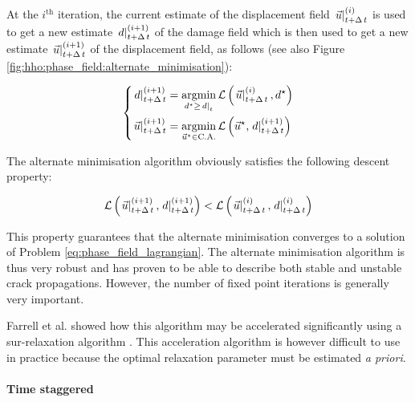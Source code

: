 At the \(i^{\text{th}}\) iteration, the current estimate of the
displacement field \(\left.\vec{u}\right|_{t+\Delta\,t}^{(i)}\) is used to get a new estimate
\(\left.d\right|_{t+\Delta\,t}^{(i+1)}\) of the damage field which is then used to get a new
estimate \(\left.\vec{u}\right|_{t+\Delta\,t}^{(i+1)}\) of the displacement field, as follows
(see also Figure \ref{fig:hho:phase_field:alternate_minimisation}):

\begin{equation}
    \left\{
    \begin{aligned}
        \left.d\right|_{t+\Delta\,t}^{(i+1)}       &= \underset{d^{\star}\geq\left.d\right|_{t}}{\mathrm{argmin}{}}\, \mathcal{L}\left(\left.\vec{u}\right|_{t+\Delta\,t}^{(i)},d^{\star}\right)
        \\
        \left.\vec{u}\right|_{t+\Delta\,t}^{(i+1)} &= \underset{\vec{u}^{\star}\in\text{C.A.}}{\mathrm{argmin}{}}\, \mathcal{L}\left(\vec{u}^{\star},\left.d\right|_{t+\Delta\,t}^{(i+1)}\right)
    \end{aligned}
    \right.
\end{equation}

The alternate minimisation algorithm obviously satisfies the following
descent property:

\begin{equation}
    \label{eq:phase_field:alternate_minimisation:descent_property}
    \mathcal{L}\left(\left.\vec{u}\right|_{t+\Delta\,t}^{(i+1)},\left.d\right|_{t+\Delta\,t}^{(i+1)}\right)<\mathcal{L}\left(\left.\vec{u}\right|_{t+\Delta\,t}^{(i)},\left.d\right|_{t+\Delta\,t}^{(i)}\right)
\end{equation}

This property guarantees that the alternate minimisation converges to a
solution of Problem \eqref{eq:phase_field_lagrangian}. The alternate
minimisation algorithm is thus very robust and has proven to be able to
describe both stable and unstable crack propagations. However, the
number of fixed point iterations is generally very important.

Farrell et al. showed how this algorithm may be accelerated
significantly using a sur-relaxation algorithm \cite{farrell_linear_2017}.
This acceleration algorithm is however difficult to use in practice
because the optimal relaxation parameter must be estimated \textit{a priori}.

\paragraph{Time staggered}
\label{sec:hho:time_staggered}


